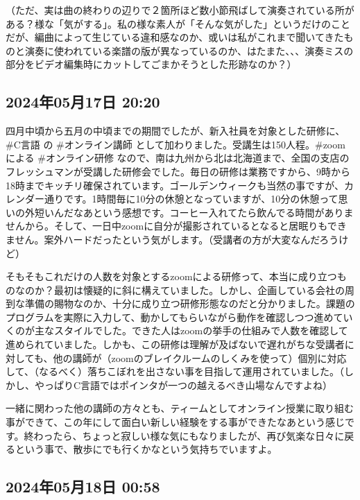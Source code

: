 \documentclass[facebook_diary.tex]{subfiles}
\begin{document}
（ただ、実は曲の終わりの辺りで２箇所ほど数小節飛ばして演奏されている所がある？様な「気がする」。私の様な素人が「そんな気がした」というだけのことだが、編曲によって生じている違和感なのか、或いは私がこれまで聞いてきたものと演奏に使われている楽譜の版が異なっているのか、はたまた、、、演奏ミスの部分をビデオ編集時にカットしてごまかそうとした形跡なのか？）

\subsection*{2024年05月17日 20:20}

四月中頃から五月の中頃までの期間でしたが、新入社員を対象とした研修に、\#C言語 の \#オンライン講師 として加わりました。受講生は150人程。\#zoom による \#オンライン研修 なので、南は九州から北は北海道まで、全国の支店のフレッシュマンが受講した研修会でした。毎日の研修は業務ですから、9時から18時までキッチリ確保されています。ゴールデンウィークも当然の事ですが、カレンダー通りです。1時間毎に10分の休憩となっていますが、10分の休憩って思いの外短いんだなあという感想です。コーヒー入れてたら飲んでる時間がありませんから。そして、一日中zoomに自分が撮影されているとなると居眠りもできません。案外ハードだったという気がします。（受講者の方が大変なんだろうけど）


そもそもこれだけの人数を対象とするzoomによる研修って、本当に成り立つものなのか？最初は懐疑的に斜に構えていました。しかし、企画している会社の周到な準備の賜物なのか、十分に成り立つ研修形態なのだと分かりました。課題のプログラムを実際に入力して、動かしてもらいながら動作を確認しつつ進めていくのが主なスタイルでした。できた人はzoomの挙手の仕組みで人数を確認して進められていました。しかも、この研修は理解が及ばないで遅れがちな受講者に対しても、他の講師が（zoomのブレイクルームのしくみを使って）個別に対応して、（なるべく）落ちこぼれを出さない事を目指して運用されていました。（しかし、やっぱりC言語ではポインタが一つの越えるべき山場なんですよね）


一緒に関わった他の講師の方々とも、ティームとしてオンライン授業に取り組む事ができて、この年にして面白い新しい経験をする事ができたなあという感じです。終わったら、ちょっと寂しい様な気にもなりましたが、再び気楽な日々に戻るという事で、散歩にでも行くかなという気持ちでいますよ。

\subsection*{2024年05月18日 00:58}
\end{document}
